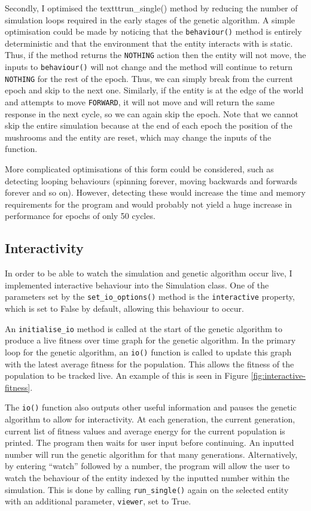 \documentclass[12pt,a4paper,twoside,openright]{report}
\begin{document}
Secondly, I optimised the texttt{run\_single()} method by reducing the number of simulation loops required in the early stages of the genetic algorithm. A simple optimisation could be made by noticing that the \texttt{behaviour()} method is entirely deterministic and that the environment that the entity interacts with is static. Thus, if the method returns the \texttt{NOTHING} action then the entity will not move, the inputs to \texttt{behaviour()} will not change and the method will continue to return \texttt{NOTHING} for the rest of the epoch. Thus, we can simply break from the current epoch and skip to the next one. Similarly, if the entity is at the edge of the world and attempts to move \texttt{FORWARD}, it will not move and will return the same response in the next cycle, so we can again skip the epoch. Note that we cannot skip the entire simulation because at the end of each epoch the position of the mushrooms and the entity are reset, which may change the inputs of the function.

More complicated optimisations of this form could be considered, such as detecting looping behaviours (spinning forever, moving backwards and forwards forever and so on). However, detecting these would increase the time and memory requirements for the program and would probably not yield a huge increase in performance for epochs of only 50 cycles.

\subsection{Interactivity}\label{section:interactivity}

In order to be able to watch the simulation and genetic algorithm occur live, I implemented interactive behaviour into the Simulation class. One of the parameters set by the \texttt{set\_io\_options()} method is the \texttt{interactive} property, which is set to False by default, allowing this behaviour to occur.

An \texttt{initialise\_io} method is called at the start of the genetic algorithm to produce a live fitness over time graph for the genetic algorithm. In the primary loop for the genetic algorithm, an \texttt{io()} function is called to update this graph with the latest average fitness for the population. This allows the fitness of the population to be tracked live. An example of this is seen in Figure \ref{fig:interactive-fitness}.


The \texttt{io()} function also outputs other useful information and pauses the genetic algorithm to allow for interactivity. At each generation, the current generation, current list of fitness values and average energy for the current population is printed. The program then waits for user input before continuing. An inputted number will run the genetic algorithm for that many generations. Alternatively, by entering ``watch'' followed by a number, the program will allow the user to watch the behaviour of the entity indexed by the inputted number within the simulation. This is done by calling \texttt{run\_single()} again on the selected entity with an additional parameter, \texttt{viewer}, set to True.
\end{document}
